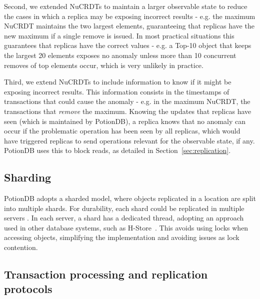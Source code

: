\documentclass[sigplan,twocolumn,review,anonymous]{acmart}
\begin{document}
Second, we extended NuCRDTs to maintain a larger observable state to 
reduce the cases in which a replica may be exposing incorrect results - e.g. 
the maximum NuCRDT maintains the two largest elements, guaranteeing that replicas have 
the new maximum if a single remove is issued.
In most practical situations this guarantees that replicas have the correct values - e.g. 
a Top-10 object that keeps the largest 20 elements exposes no anomaly unless
more than 10 concurrent removes of top elements occur, which is very unlikely in practice.

Third, we extend NuCRDTs to include information to know if it might be exposing incorrect results. 
This information consists in the timestamps of transactions that could cause the anomaly - e.g. in the maximum NuCRDT, 
the transactions that \emph{remove} the maximum.
Knowing the updates that replicas have seen (which is maintained by PotionDB), 
a replica knows that no anomaly can occur if the problematic operation has been seen by all replicas, 
which would have triggered replicas to send operations relevant for the observable state, if any.
PotionDB uses this to block reads, as detailed in Section~\ref{sec:replication}.




\subsection{Sharding}
\label{subsec:sharding}

PotionDB adopts a sharded model, where objects replicated in a location are 
split into multiple shards. For durability, each shard could be replicated in multiple
servers \cite{paxos,raft}. %
In each server, a shard has a dedicated thread, adopting an approach used in other
database systems, such as H-Store~\cite{h-store}. This avoids using locks when 
accessing objects, simplifying the implementation and avoiding issues 
as lock contention.


\subsection{Transaction processing and replication protocols}
\label{subsec:txnproc}
\end{document}
